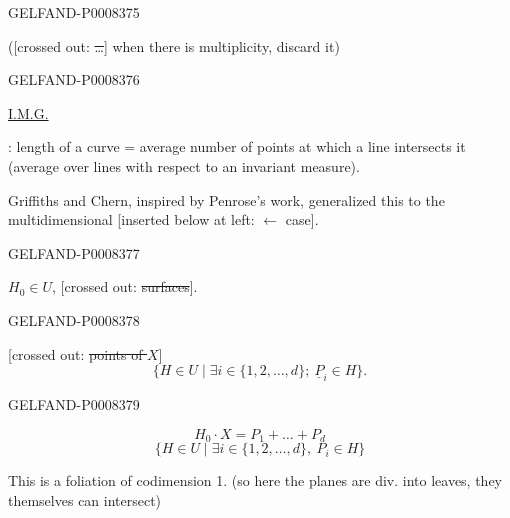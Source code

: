 \begin{GelfandAdjacentEvidence}{GELFAND-P000837}{5}


([crossed out: \sout{…}] when there is multiplicity, discard it)
\end{GelfandAdjacentEvidence}
\begin{GelfandAdjacentEvidence}{GELFAND-P000837}{6}


\uline{I.M.G.}

: length of a curve = average number of points at which a line intersects it
(average over lines with respect to an invariant measure).

Griffiths and Chern, inspired by Penrose's work, generalized this to the multidimensional [inserted below at left: \(\leftarrow\) case].
\end{GelfandAdjacentEvidence}
\begin{GelfandAdjacentEvidence}{GELFAND-P000837}{7}


 \(H_0\in U\), 
[crossed out: \sout{surfaces}].
\end{GelfandAdjacentEvidence}
\begin{GelfandAdjacentEvidence}{GELFAND-P000837}{8}


[crossed out: \sout{points of \(X\)}] 
\[
\{H\in U\mid \exists i\in\{1,2,\ldots,d\};\ \underline{P}_i\in H\}.
\]
\end{GelfandAdjacentEvidence}
\begin{GelfandAdjacentEvidence}{GELFAND-P000837}{9}

\[
H_0\cdot X=P_1+\ldots+P_d
\]
\begin{equation*}
\{H\in U\mid \exists i\in\{1,2,\ldots,d\},\ P_i\in H\}
\tag{2}
\end{equation*}

This is a foliation of codimension 1. (so here the planes are div. into leaves, they themselves can intersect)
\end{GelfandAdjacentEvidence}
